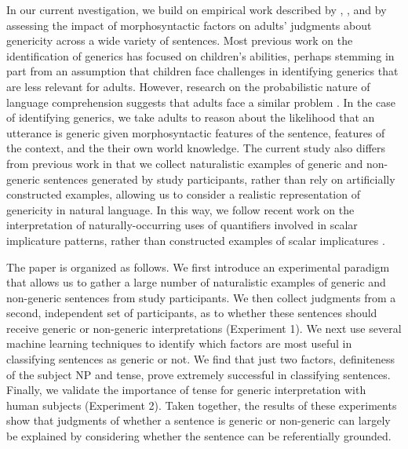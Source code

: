 \documentclass[10pt,letterpaper]{article}
\begin{document}

In our current nvestigation, we build on empirical work described by ,  , and  by assessing the impact of morphosyntactic factors on adults' judgments about genericity across a wide variety of sentences. Most previous work on the identification of generics has focused on children's abilities, perhaps stemming in part from an assumption that children face challenges in identifying generics that are less relevant for adults. However, research on the probabilistic nature of language comprehension suggests that adults face a similar problem \cite{Levy:2008,Frank:2012}. In the case of identifying generics, we take adults to reason about the likelihood that an utterance is generic given morphosyntactic features of the sentence, features of the context, and the their own world knowledge. The current study also differs from previous work in that we collect naturalistic examples of generic and non-generic sentences generated by study participants, rather than rely on artificially constructed examples, allowing us to consider a realistic representation of genericity in natural language. In this way, we follow recent work on the interpretation of naturally-occurring uses of quantifiers involved in scalar implicature patterns, rather than constructed examples of scalar implicatures \cite{Degen:2015}.

The paper is organized as follows. We first introduce an experimental paradigm that allows us to gather a large number of naturalistic examples of generic and non-generic sentences from study participants. We then collect judgments from a second, independent set of participants, as to whether these sentences should receive generic or non-generic interpretations (Experiment 1). We next use several machine learning techniques to identify which factors are most useful in classifying sentences as generic or not. We find that just two factors, definiteness of the subject NP and tense, prove extremely successful in classifying sentences. Finally, we validate the importance of tense for generic interpretation with human subjects (Experiment 2). Taken together, the results of these experiments show that judgments of whether a sentence is generic or non-generic can largely be explained by considering whether the sentence can be referentially grounded.
\end{document}
